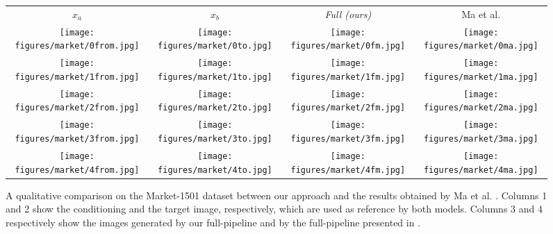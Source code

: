 \documentclass[10pt,twocolumn,letterpaper]{article}
\begin{document}
\begin{figure*}[h]
  \centering
  \setlength\tabcolsep{1.0pt}
\begin{tabular}{cccc}
$x_a$ & $x_b$ & \small\emph{Full (ours)}& Ma et al. \cite{ma2017pose}\\ 
\texttt{[image: figures/market/0from.jpg]}
&\texttt{[image: figures/market/0to.jpg]}
&\texttt{[image: figures/market/0fm.jpg]}
&\texttt{[image: figures/market/0ma.jpg]}
\\
\texttt{[image: figures/market/1from.jpg]}
&\texttt{[image: figures/market/1to.jpg]}
&\texttt{[image: figures/market/1fm.jpg]}
&\texttt{[image: figures/market/1ma.jpg]}
\\
\texttt{[image: figures/market/2from.jpg]}
&\texttt{[image: figures/market/2to.jpg]}
&\texttt{[image: figures/market/2fm.jpg]}
&\texttt{[image: figures/market/2ma.jpg]}
\\
\texttt{[image: figures/market/3from.jpg]}
&\texttt{[image: figures/market/3to.jpg]}
&\texttt{[image: figures/market/3fm.jpg]}
&\texttt{[image: figures/market/3ma.jpg]}
\\
\texttt{[image: figures/market/4from.jpg]}
&\texttt{[image: figures/market/4to.jpg]}
&\texttt{[image: figures/market/4fm.jpg]}
&\texttt{[image: figures/market/4ma.jpg]}
\end{tabular}
  \caption{A qualitative comparison on the Market-1501 dataset between our approach and the results obtained by Ma et al. \cite{ma2017pose}. Columns 1 and 2  show the conditioning  and the target image, respectively, which are used as reference by both models. Columns 3 and 4 respectively show the images generated by our full-pipeline and by the full-pipeline presented in \cite{ma2017pose}.}
\label{fig:comparison-Market-1}
\end{figure*}
\end{document}
